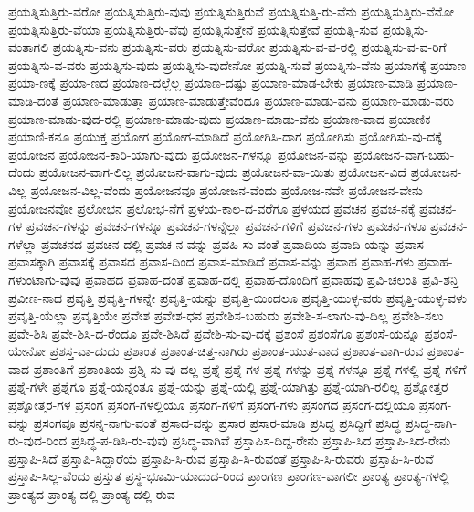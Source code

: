 {ಪ್ರಯತ್ನಿಸುತ್ತಿರು-ವರೋ
ಪ್ರಯತ್ನಿಸುತ್ತಿರು-ವುವು
ಪ್ರಯತ್ನಿಸುತ್ತಿರುವೆ
ಪ್ರಯತ್ನಿಸುತ್ತಿ-ರು-ವೆನು
ಪ್ರಯತ್ನಿಸುತ್ತಿರು-ವೆನೋ
ಪ್ರಯತ್ನಿಸುತ್ತಿರು-ವೆಯಾ
ಪ್ರಯತ್ನಿಸುತ್ತಿರು-ವೆವು
ಪ್ರಯತ್ನಿಸುತ್ತೇನೆ
ಪ್ರಯತ್ನಿಸುತ್ತೇವೆ
ಪ್ರಯತ್ನಿ-ಸುವ
ಪ್ರಯತ್ನಿಸು-ವಂತಾಗಲಿ
ಪ್ರಯತ್ನಿಸು-ವನು
ಪ್ರಯತ್ನಿಸು-ವರು
ಪ್ರಯತ್ನಿಸು-ವರೋ
ಪ್ರಯತ್ನಿಸು-ವ-ವ-ರಲ್ಲಿ
ಪ್ರಯತ್ನಿಸು-ವ-ವ-ರಿಗೆ
ಪ್ರಯತ್ನಿಸು-ವ-ವರು
ಪ್ರಯತ್ನಿಸು-ವುದು
ಪ್ರಯತ್ನಿಸು-ವುದೇನೋ
ಪ್ರಯತ್ನಿ-ಸುವೆ
ಪ್ರಯತ್ನಿಸು-ವೆನು
ಪ್ರಯಾಗಕ್ಕೆ
ಪ್ರಯಾಣ
ಪ್ರಯಾ-ಣಕ್ಕೆ
ಪ್ರಯಾ-ಣದ
ಪ್ರಯಾಣ-ದಲ್ಲೆಲ್ಲ
ಪ್ರಯಾಣ-ದಷ್ಟು
ಪ್ರಯಾಣ-ಮಾಡ-ಬೇಕು
ಪ್ರಯಾಣ-ಮಾಡಿ
ಪ್ರಯಾಣ-ಮಾಡಿ-ದಂತೆ
ಪ್ರಯಾಣ-ಮಾಡುತ್ತಾ
ಪ್ರಯಾಣ-ಮಾಡುತ್ತೇವೆಂದೂ
ಪ್ರಯಾಣ-ಮಾಡು-ವನು
ಪ್ರಯಾಣ-ಮಾಡು-ವರು
ಪ್ರಯಾಣ-ಮಾಡು-ವುದ-ರಲ್ಲಿ
ಪ್ರಯಾಣ-ಮಾಡು-ವುದು
ಪ್ರಯಾಣ-ಮಾಡು-ವೆನು
ಪ್ರಯಾಣ-ವಾದ
ಪ್ರಯಾಣಿಕ
ಪ್ರಯಾಣಿ-ಕನೂ
ಪ್ರಯುಕ್ತ
ಪ್ರಯೋಗ
ಪ್ರಯೋಗ-ಮಾಡಿದೆ
ಪ್ರಯೋಗಿಸಿ-ದಾಗ
ಪ್ರಯೋಗಿಸು
ಪ್ರಯೋಗಿಸು-ವು-ದಕ್ಕೆ
ಪ್ರಯೋಜನ
ಪ್ರಯೋಜನ-ಕಾರಿ-ಯಾಗು-ವುದು
ಪ್ರಯೋಜನ-ಗಳನ್ನೂ
ಪ್ರಯೋಜನ-ವನ್ನು
ಪ್ರಯೋಜನ-ವಾಗ-ಬಹು-ದೆಂದು
ಪ್ರಯೋಜನ-ವಾಗ-ಲಿಲ್ಲ
ಪ್ರಯೋಜನ-ವಾಗು-ವುದು
ಪ್ರಯೋಜನ-ವಾ-ಯಿತು
ಪ್ರಯೋಜನ-ವಿದೆ
ಪ್ರಯೋಜನ-ವಿಲ್ಲ
ಪ್ರಯೋಜನ-ವಿಲ್ಲ-ವೆಂದು
ಪ್ರಯೋಜನವೂ
ಪ್ರಯೋಜನ-ವೆಂದು
ಪ್ರಯೋಜ-ನವೇ
ಪ್ರಯೋಜನ-ವೇನು
ಪ್ರಯೋಜನವೋ
ಪ್ರಲೋಭನ
ಪ್ರಲೋಭ-ನೆಗೆ
ಪ್ರಳಯ-ಕಾಲ-ದ-ವರೆಗೂ
ಪ್ರಳಯದ
ಪ್ರವಚನ
ಪ್ರವಚ-ನಕ್ಕೆ
ಪ್ರವಚನ-ಗಳ
ಪ್ರವಚನ-ಗಳನ್ನು
ಪ್ರವಚನ-ಗಳನ್ನೂ
ಪ್ರವಚನ-ಗಳನ್ನೆಲ್ಲಾ
ಪ್ರವಚನ-ಗಳಿಗೆ
ಪ್ರವಚನ-ಗಳು
ಪ್ರವಚನ-ಗಳೂ
ಪ್ರವಚನ-ಗಳೆಲ್ಲಾ
ಪ್ರವಚನದ
ಪ್ರವಚನ-ದಲ್ಲಿ
ಪ್ರವಚ-ನ-ವನ್ನು
ಪ್ರವಹಿ-ಸು-ವಂತೆ
ಪ್ರವಾದಿಯ
ಪ್ರವಾದಿ-ಯನ್ನು
ಪ್ರವಾಸ
ಪ್ರವಾಸಕ್ಕಾಗಿ
ಪ್ರವಾಸಕ್ಕೆ
ಪ್ರವಾಸದ
ಪ್ರವಾಸ-ದಿಂದ
ಪ್ರವಾಸ-ಮಾಡಿದೆ
ಪ್ರವಾಸ-ವನ್ನು
ಪ್ರವಾಹ
ಪ್ರವಾಹ-ಗಳು
ಪ್ರವಾಹ-ಗಳುಂಟಾಗು-ವುವು
ಪ್ರವಾಹದ
ಪ್ರವಾಹ-ದಂತೆ
ಪ್ರವಾಹ-ದಲ್ಲಿ
ಪ್ರವಾಹ-ದೊಂದಿಗೆ
ಪ್ರವಾಹವು
ಪ್ರವಿ-ಚಲಂತಿ
ಪ್ರವಿ-ಶನ್ತಿ
ಪ್ರವೀಣ-ನಾದ
ಪ್ರವೃತ್ತಿ
ಪ್ರವೃತ್ತಿ-ಗಳನ್ನೇ
ಪ್ರವೃತ್ತಿ-ಯನ್ನು
ಪ್ರವೃತ್ತಿ-ಯಿಂದಲೂ
ಪ್ರವೃತ್ತಿ-ಯುಳ್ಳ-ವರು
ಪ್ರವೃತ್ತಿ-ಯುಳ್ಳ-ವಳು
ಪ್ರವೃತ್ತಿ-ಯೆಲ್ಲಾ
ಪ್ರವೃತ್ತಿಯೇ
ಪ್ರವೇಶ
ಪ್ರವೇಶ-ಧನ
ಪ್ರವೇಶಿಸ-ಬಹುದು
ಪ್ರವೇಶಿ-ಸ-ಲಾಗು-ವು-ದಿಲ್ಲ
ಪ್ರವೇಶಿ-ಸಲು
ಪ್ರವೇ-ಶಿಸಿ
ಪ್ರವೇ-ಶಿಸಿ-ದ-ರೆಂದೂ
ಪ್ರವೇ-ಶಿಸಿದೆ
ಪ್ರವೇಶಿ-ಸು-ವು-ದಕ್ಕೆ
ಪ್ರಶಂಸೆ
ಪ್ರಶಂಸೆಗೂ
ಪ್ರಶಂಸೆ-ಯನ್ನೂ
ಪ್ರಶಂಸೆ-ಯೇನೋ
ಪ್ರಶಸ್ತ-ವಾ-ದುದು
ಪ್ರಶಾಂತ
ಪ್ರಶಾಂತ-ಚಿತ್ತ-ನಾಗಿರು
ಪ್ರಶಾಂತ-ಯುತ-ವಾದ
ಪ್ರಶಾಂತ-ವಾಗಿ-ರುವ
ಪ್ರಶಾಂತ-ವಾದ
ಪ್ರಶಾಂತಿಗೆ
ಪ್ರಶಾಂತಿಯ
ಪ್ರಶ್ನಿ-ಸು-ವು-ದಲ್ಲ
ಪ್ರಶ್ನೆ
ಪ್ರಶ್ನೆ-ಗಳ
ಪ್ರಶ್ನೆ-ಗಳನ್ನು
ಪ್ರಶ್ನೆ-ಗಳನ್ನೂ
ಪ್ರಶ್ನೆ-ಗಳಲ್ಲಿ
ಪ್ರಶ್ನೆ-ಗಳಿಗೆ
ಪ್ರಶ್ನೆ-ಗಳೇ
ಪ್ರಶ್ನೆಗೂ
ಪ್ರಶ್ನೆ-ಯನ್ನಂತೂ
ಪ್ರಶ್ನೆ-ಯನ್ನು
ಪ್ರಶ್ನೆ-ಯಲ್ಲಿ
ಪ್ರಶ್ನೆ-ಯಾಗಿತ್ತು
ಪ್ರಶ್ನೆ-ಯಾಗಿ-ರಲಿಲ್ಲ
ಪ್ರಶ್ನೋತ್ತರ
ಪ್ರಶ್ನೋತ್ತರ-ಗಳ
ಪ್ರಸಂಗ
ಪ್ರಸಂಗ-ಗಳಲ್ಲಿಯೂ
ಪ್ರಸಂಗ-ಗಳಿಗೆ
ಪ್ರಸಂಗ-ಗಳು
ಪ್ರಸಂಗದ
ಪ್ರಸಂಗ-ದಲ್ಲಿಯೂ
ಪ್ರಸಂಗ-ವನ್ನು
ಪ್ರಸಂಗವೂ
ಪ್ರಸನ್ನ-ನಾಗು-ವಂತೆ
ಪ್ರಸಾದ-ವನ್ನು
ಪ್ರಸಾರ
ಪ್ರಸಾರ-ಮಾಡಿ
ಪ್ರಸಿದ್ದ
ಪ್ರಸಿದ್ದಿಗೆ
ಪ್ರಸಿದ್ಧ
ಪ್ರಸಿದ್ಧ-ನಾಗಿ-ರು-ವುದ-ರಿಂದ
ಪ್ರಸಿದ್ಧ-ಪ-ಡಿಸಿ-ರು-ವುವು
ಪ್ರಸಿದ್ಧ-ವಾಗಿವೆ
ಪ್ರಸ್ತಾಪಿಸ-ದಿದ್ದ-ರೇನು
ಪ್ರಸ್ತಾಪಿ-ಸಿದ
ಪ್ರಸ್ತಾಪಿ-ಸಿದ-ರೇನು
ಪ್ರಸ್ತಾಪಿ-ಸಿದೆ
ಪ್ರಸ್ತಾಪಿ-ಸಿದ್ದಾರೆಯೆ
ಪ್ರಸ್ತಾಪಿ-ಸಿ-ರುವ
ಪ್ರಸ್ತಾಪಿ-ಸಿ-ರುವಂತೆ
ಪ್ರಸ್ತಾಪಿ-ಸಿ-ರುವರು
ಪ್ರಸ್ತಾಪಿ-ಸಿ-ರುವೆ
ಪ್ರಸ್ತಾಪಿ-ಸಿಲ್ಲ-ವೆಂದು
ಪ್ರಸ್ತುತ
ಪ್ರಸ್ಥ-ಭೂಮಿ-ಯಾದುದ-ರಿಂದ
ಪ್ರಾಂಗಣ
ಪ್ರಾಂಗಣ-ವಾಗಲೀ
ಪ್ರಾಂತ್ಯ
ಪ್ರಾಂತ್ಯ-ಗಳಲ್ಲಿ
ಪ್ರಾಂತ್ಯದ
ಪ್ರಾಂತ್ಯ-ದಲ್ಲಿ
ಪ್ರಾಂತ್ಯ-ದಲ್ಲಿ-ರುವ
}
